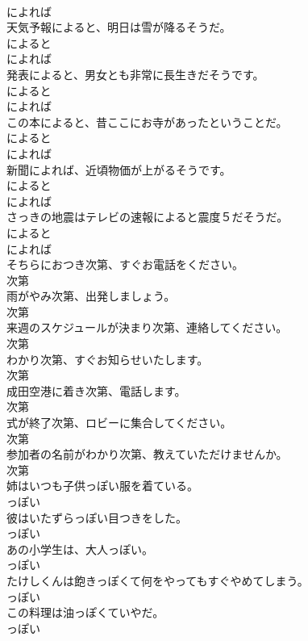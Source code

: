 \documentclass[8pt]{extreport}
\begin{document}
\begin{CJK}{UTF8}{min}
\\	によれば
\\	天気予報によると、明日は雪が降るそうだ。	
\\	によると 
\\	によれば
\\	発表によると、男女とも非常に長生きだそうです。	
\\	によると 
\\	によれば
\\	この本によると、昔ここにお寺があったということだ。	
\\	によると 
\\	によれば
\\	新聞によれば、近頃物価が上がるそうです。	
\\	によると 
\\	によれば
\\	さっきの地震はテレビの速報によると震度５だそうだ。	
\\	によると 
\\	によれば
\\	そちらにおつき次第、すぐお電話をください。	
\\	次第
\\	雨がやみ次第、出発しましょう。	
\\	次第
\\	来週のスケジュールが決まり次第、連絡してください。	
\\	次第
\\	わかり次第、すぐお知らせいたします。	
\\	次第
\\	成田空港に着き次第、電話します。	
\\	次第
\\	式が終了次第、ロビーに集合してください。	
\\	次第
\\	参加者の名前がわかり次第、教えていただけませんか。	
\\	次第
\\	姉はいつも子供っぽい服を着ている。	
\\	っぽい
\\	彼はいたずらっぽい目つきをした。	
\\	っぽい
\\	あの小学生は、大人っぽい。	
\\	っぽい
\\	たけしくんは飽きっぽくて何をやってもすぐやめてしまう。	
\\	っぽい
\\	この料理は油っぽくていやだ。	
\\	っぽい

\end{CJK}
\end{document}
